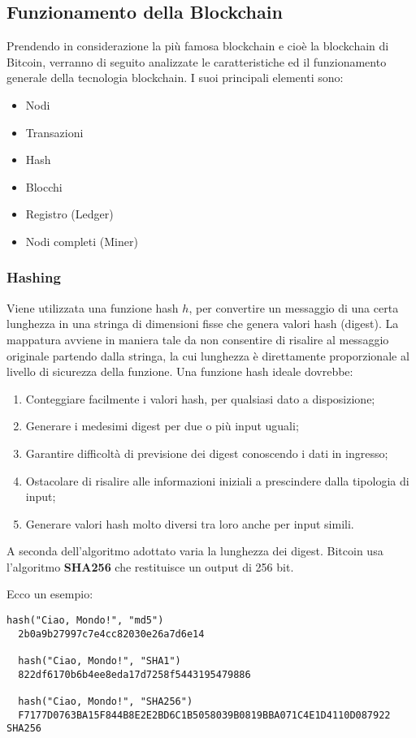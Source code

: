 \subsection{Funzionamento della Blockchain}
Prendendo in considerazione la più famosa blockchain e cioè la blockchain di Bitcoin, verranno di seguito analizzate le caratteristiche ed il funzionamento generale della tecnologia blockchain. I suoi principali elementi sono:

\begin{itemize}
  \item Nodi
  \item Transazioni
  \item Hash
  \item Blocchi
  \item Registro (Ledger)
  \item Nodi completi (Miner)
\end{itemize}

\subsubsection{Hashing}
Viene utilizzata una funzione hash \(h\), per convertire un messaggio di una certa lunghezza in una stringa di dimensioni fisse che genera valori hash (digest). La mappatura avviene in maniera tale da non consentire di risalire al messaggio originale partendo dalla stringa, la cui lunghezza è direttamente proporzionale al livello di sicurezza della funzione. Una funzione hash ideale dovrebbe:

\begin{enumerate}
  \item Conteggiare facilmente i valori hash, per qualsiasi dato a disposizione;
  \item Generare i medesimi digest per due o più input uguali;
  \item Garantire difficoltà di previsione dei digest conoscendo i dati in ingresso;
  \item Ostacolare di risalire alle informazioni iniziali a prescindere dalla tipologia di input;
  \item Generare valori hash molto diversi tra loro anche per input simili.
\end{enumerate}

A seconda dell'algoritmo adottato varia la lunghezza dei digest. Bitcoin
usa l'algoritmo \textbf{SHA256} che restituisce un output di 256 bit.

Ecco un esempio:
\begin{lstlisting}[language=logfile,breaklines]
  hash("Ciao, Mondo!", "md5")
  2b0a9b27997c7e4cc82030e26a7d6e14

  hash("Ciao, Mondo!", "SHA1")
  822df6170b6b4ee8eda17d7258f5443195479886

  hash("Ciao, Mondo!", "SHA256")
  F7177D0763BA15F844B8E2E2BD6C1B5058039B0819BBA071C4E1D4110D087922 SHA256
\end{lstlisting}

